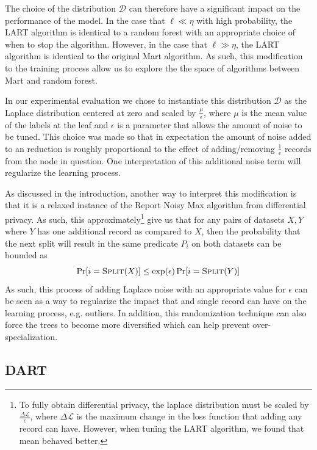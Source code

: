 \documentclass{article} %
\begin{document}
The choice of the distribution $\mathcal{D}$ can therefore have a significant impact on the performance of the model. In the case that $\ell \ll \eta$ with high probability,  the LART algorithm is identical to a random forest with an appropriate choice of when to stop the algorithm. However, in the case that $\ell \gg \eta$, the LART algorithm is identical to the original Mart algorithm. As such, this modification to the training process allow us to explore the the space of algorithms between Mart and random forest.

In our experimental evaluation we chose to instantiate this distribution $\mathcal{D}$ as the Laplace distribution centered at zero and scaled by $\frac{\mu}{\epsilon}$, where $\mu$ is the mean value of the labels at the leaf and $\epsilon$ is a parameter that allows the amount of noise to be tuned. This choice was made so that in expectation the amount of noise added to an reduction is roughly proportional to the effect of adding/removing $\frac{1}{\epsilon}$ records from the node in question. One interpretation of this additional noise term will regularize the learning process.

As discussed in the introduction, another way to interpret this modification is that it is a relaxed instance of the Report Noisy Max\cite{privacyBook} algorithm from differential privacy. As such, this approximately\footnote{To fully obtain differential privacy, the laplace distribution must be scaled by $\frac{ \Delta\mathcal{L}}{\epsilon}$, where $\Delta\mathcal{L}$ is the maximum change in the loss function that adding any record can have. However, when tuning the LART algorithm, we found that mean behaved better.} give us that for any pairs of datasets $X,Y$ where $Y$ has one additional record as compared to $X$, then the probability that the next split will result in the same predicate $P_i$ on both datasets can be bounded as
$$
	\Pr[i = \textsc{Split}(X)] \leq \exp(\epsilon)\Pr[i =\textsc{Split}(Y)]
$$
As such, this process of adding Laplace noise with an appropriate value for $\epsilon$ can be seen as a way to regularize the impact that and single record can have on the learning process, e.g. outliers. In addition, this randomization technique can also force the trees to become more diversified which can help prevent over-specialization.

\subsection{DART}
\end{document}
